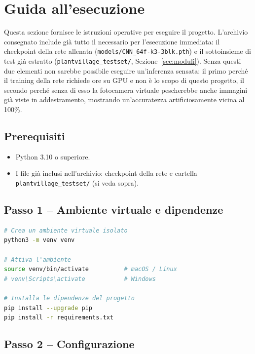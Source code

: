 \section{Guida all'esecuzione}
\label{sec:esecuzione}

Questa sezione fornisce le istruzioni operative per eseguire il progetto.
L'archivio consegnato include già tutto il necessario per l'esecuzione
immediata: il checkpoint della rete allenata
(\texttt{models/CNN\_64f-k3-3blk.pth}) e il sottoinsieme di test già
estratto (\texttt{plantvillage\_testset/}, Sezione~\ref{sec:moduli}).
Senza questi due elementi non sarebbe possibile eseguire un'inferenza
sensata: il primo perché il training della rete richiede ore su GPU e non è
lo scopo di questo progetto, il secondo perché senza di esso la fotocamera
virtuale pescherebbe anche immagini già viste in addestramento, mostrando
un'accuratezza artificiosamente vicina al 100\%.

\subsection{Prerequisiti}

\begin{itemize}
    \item Python 3.10 o superiore.
    \item I file già inclusi nell'archivio: checkpoint della rete e
    cartella \texttt{plantvillage\_testset/} (si veda sopra).
\end{itemize}

\subsection{Passo 1 -- Ambiente virtuale e dipendenze}

\begin{lstlisting}[language=bash]
# Crea un ambiente virtuale isolato
python3 -m venv venv

# Attiva l'ambiente
source venv/bin/activate          # macOS / Linux
# venv\Scripts\activate           # Windows

# Installa le dipendenze del progetto
pip install --upgrade pip
pip install -r requirements.txt
\end{lstlisting}

\subsection{Passo 2 -- Configurazione}


